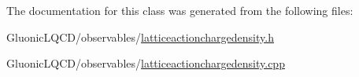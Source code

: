 The documentation for this class was generated from the following files\+:\begin{DoxyCompactItemize}
\item 
Gluonic\+L\+Q\+C\+D/observables/\mbox{\hyperlink{latticeactionchargedensity_8h}{latticeactionchargedensity.\+h}}\item 
Gluonic\+L\+Q\+C\+D/observables/\mbox{\hyperlink{latticeactionchargedensity_8cpp}{latticeactionchargedensity.\+cpp}}\end{DoxyCompactItemize}
